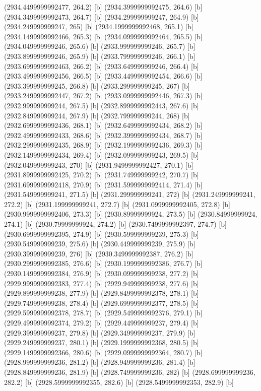 {{{(2934.4499999992477, 264.2) [b] 
(2934.3999999992475, 264.6) [b] 
(2934.3499999992473, 264.7) [b] 
(2934.299999999247, 264.9) [b] 
(2934.249999999247, 265) [b] 
(2934.1999999992468, 265.1) [b] 
(2934.1499999992466, 265.3) [b] 
(2934.0999999992464, 265.5) [b] 
(2934.049999999246, 265.6) [b] 
(2933.999999999246, 265.7) [b] 
(2933.899999999246, 265.9) [b] 
(2933.799999999246, 266.1) [b] 
(2933.6999999992463, 266.2) [b] 
(2933.649999999246, 266.4) [b] 
(2933.4999999992456, 266.5) [b] 
(2933.4499999992454, 266.6) [b] 
(2933.399999999245, 266.8) [b] 
(2933.299999999245, 267) [b] 
(2933.2499999992447, 267.2) [b] 
(2933.0999999992446, 267.3) [b] 
(2932.999999999244, 267.5) [b] 
(2932.8999999992443, 267.6) [b] 
(2932.849999999244, 267.9) [b] 
(2932.799999999244, 268) [b] 
(2932.6999999992436, 268.1) [b] 
(2932.6499999992434, 268.2) [b] 
(2932.4999999992433, 268.6) [b] 
(2932.3999999992434, 268.7) [b] 
(2932.2999999992435, 268.9) [b] 
(2932.1999999992436, 269.3) [b] 
(2932.1499999992434, 269.4) [b] 
(2932.099999999243, 269.5) [b] 
(2932.049999999243, 270) [b] 
(2931.9499999992427, 270.1) [b] 
(2931.8999999992425, 270.2) [b] 
(2931.749999999242, 270.7) [b] 
(2931.6999999992418, 270.9) [b] 
(2931.5999999992414, 271.4) [b] 
(2931.549999999241, 271.5) [b] 
(2931.299999999241, 272) [b] 
(2931.249999999241, 272.2) [b] 
(2931.199999999241, 272.7) [b] 
(2931.0999999992405, 272.8) [b] 
(2930.9999999992406, 273.3) [b] 
(2930.89999999924, 273.5) [b] 
(2930.84999999924, 274.1) [b] 
(2930.79999999924, 274.2) [b] 
(2930.7499999992397, 274.7) [b] 
(2930.6999999992395, 274.9) [b] 
(2930.599999999239, 275.3) [b] 
(2930.549999999239, 275.6) [b] 
(2930.449999999239, 275.9) [b] 
(2930.399999999239, 276) [b] 
(2930.3499999992387, 276.2) [b] 
(2930.2999999992385, 276.6) [b] 
(2930.1999999992386, 276.7) [b] 
(2930.1499999992384, 276.9) [b] 
(2930.099999999238, 277.2) [b] 
(2929.9999999992383, 277.4) [b] 
(2929.949999999238, 277.6) [b] 
(2929.899999999238, 277.9) [b] 
(2929.8499999992378, 278.1) [b] 
(2929.749999999238, 278.4) [b] 
(2929.6999999992377, 278.5) [b] 
(2929.5999999992378, 278.7) [b] 
(2929.5499999992376, 279.1) [b] 
(2929.4999999992374, 279.2) [b] 
(2929.449999999237, 279.4) [b] 
(2929.399999999237, 279.8) [b] 
(2929.349999999237, 279.9) [b] 
(2929.249999999237, 280.1) [b] 
(2929.1999999992368, 280.5) [b] 
(2929.1499999992366, 280.6) [b] 
(2929.0999999992364, 280.7) [b] 
(2928.999999999236, 281.2) [b] 
(2928.949999999236, 281.4) [b] 
(2928.849999999236, 281.9) [b] 
(2928.749999999236, 282) [b] 
(2928.699999999236, 282.2) [b] 
(2928.5999999992355, 282.6) [b] 
(2928.5499999992353, 282.9) [b] 
}}}

